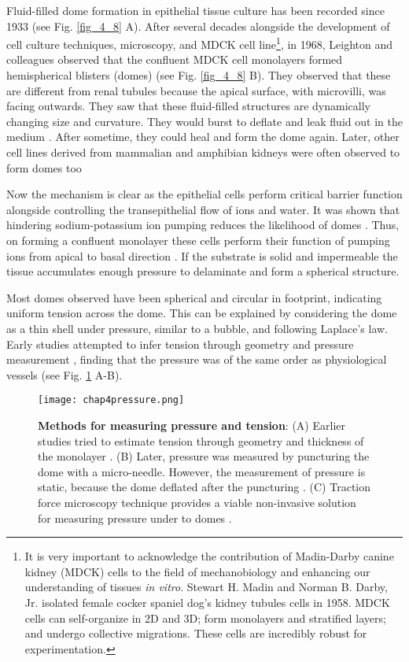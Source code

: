 Fluid-filled dome formation in epithelial tissue culture has been recorded since 1933 \cite{cameron1953} (see Fig. \ref{fig_4_8} A). After several decades alongside the development of cell culture techniques, microscopy, and MDCK cell line\footnote{It is very important to acknowledge the contribution of Madin-Darby canine kidney (MDCK) cells to the field of mechanobiology and enhancing our understanding of tissues \textit{in vitro}. Stewart H. Madin and Norman B. Darby, Jr. isolated female cocker spaniel dog’s kidney tubules cells in 1958. MDCK cells can self-organize in 2D and 3D; form monolayers and stratified layers; and undergo collective migrations. These cells are incredibly robust for experimentation.}, in 1968, Leighton and colleagues observed that the confluent MDCK cell monolayers formed hemispherical blisters (domes) \cite{leighton1969} (see Fig. \ref{fig_4_8} B). They observed that these are different from renal tubules because the apical surface, with microvilli, was facing outwards. They saw that these fluid-filled structures are dynamically changing size and curvature. They would burst to deflate and leak fluid out in the medium \cite{valentich1979}. After sometime, they could heal and form the dome again. Later, other cell lines derived from mammalian and amphibian kidneys were often observed to form domes too \cite{dulbecco1980, leighton1981, lever1979}
	
Now the mechanism is clear as the epithelial cells perform critical barrier function alongside controlling the transepithelial flow of ions and water. It was shown that hindering sodium-potassium ion pumping reduces the likelihood of domes \cite{leighton1969}. Thus, on forming a confluent monolayer these cells perform their function of pumping ions from apical to basal direction \cite{valentich1979}. If the substrate is solid and impermeable the tissue accumulates enough pressure to delaminate and form a spherical structure.

Most domes observed have been spherical and circular in footprint, indicating uniform tension across the dome. This can be explained by considering the dome as a thin shell under pressure, similar to a bubble, and following Laplace's law. Early studies attempted to infer tension through geometry and pressure measurement \cite{tanner1983}, finding that the pressure was of the same order as physiological vessels (see Fig. \ref{fig_4_9} A-B).

\begin{figure}
	\centering
	\texttt{[image: chap4pressure.png]}
	\caption{\label{fig_4_9} \textbf{Methods for measuring pressure and tension}: (A) Earlier studies tried to estimate tension through geometry and thickness of the monolayer \cite{tanner1983}. (B) Later, pressure was measured by puncturing the dome with a micro-needle. However, the measurement of pressure is static, because the dome deflated after the puncturing \cite{choudhury2022}. (C) Traction force microscopy technique provides a viable non-invasive solution for measuring pressure under to domes \cite{latorre2018}.
	}
\end{figure}

